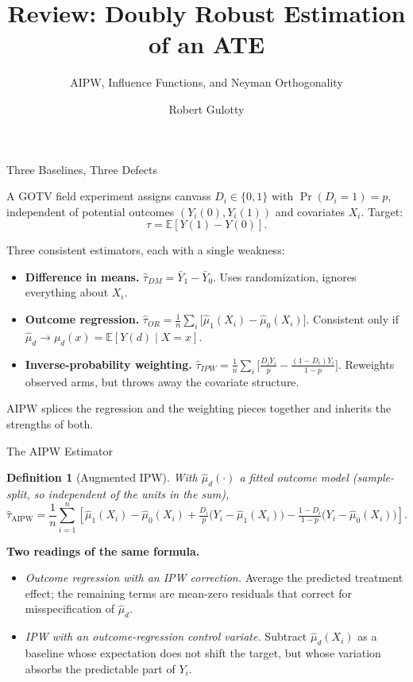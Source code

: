 \documentclass[aspectratio=169, handout, t]{beamer}
\title[PLSC 30700]{Review: Doubly Robust Estimation of an ATE}
\subtitle{AIPW, Influence Functions, and Neyman Orthogonality}
\author{Robert Gulotty}
\institute[Chicago]{University of Chicago}
\newtheorem{defn}{Definition}
\begin{document}
\begin{frame}
\titlepage
\end{frame}

\begin{frame}{Three Baselines, Three Defects}

A GOTV field experiment assigns canvass $D_i \in \{0,1\}$ with $\Pr(D_i = 1) = p$, independent of potential outcomes $(Y_i(0), Y_i(1))$ and covariates $X_i$.  Target:
$$\tau = \mathbb{E}[Y(1) - Y(0)].$$

\medskip
Three consistent estimators, each with a single weakness:
\begin{itemize}\itemsep=3pt
\item \textbf{Difference in means.}  $\hat\tau_{DM} = \bar Y_1 - \bar Y_0$.  Uses randomization, ignores everything about $X_i$.
\item \textbf{Outcome regression.}  $\hat\tau_{OR} = \tfrac{1}{n}\sum_i \big[\hat\mu_1(X_i) - \hat\mu_0(X_i)\big]$.  Consistent only if $\hat\mu_d \to \mu_d(x) = \mathbb{E}[Y(d)\mid X = x]$.
\item \textbf{Inverse-probability weighting.}  $\hat\tau_{IPW} = \tfrac{1}{n}\sum_i \big[\tfrac{D_iY_i}{p} - \tfrac{(1-D_i)Y_i}{1-p}\big]$.  Reweights observed arms, but throws away the covariate structure.
\end{itemize}

\medskip
AIPW splices the regression and the weighting pieces together and inherits the strengths of both.

\end{frame}

\begin{frame}{The AIPW Estimator}

\begin{defn}[Augmented IPW]
With $\hat\mu_d(\cdot)$ a fitted outcome model (sample-split, so independent of the units in the sum),
$$\hat\tau_{\mathrm{AIPW}} = \frac{1}{n}\sum_{i=1}^n \left[\hat\mu_1(X_i) - \hat\mu_0(X_i) + \tfrac{D_i}{p}\big(Y_i - \hat\mu_1(X_i)\big) - \tfrac{1-D_i}{1-p}\big(Y_i - \hat\mu_0(X_i)\big)\right].$$
\end{defn}

\medskip
\textbf{Two readings of the same formula.}
\begin{itemize}\itemsep=2pt
\item \textit{Outcome regression with an IPW correction.}  Average the predicted treatment effect; the remaining terms are mean-zero residuals that correct for misspecification of $\hat\mu_d$.
\item \textit{IPW with an outcome-regression control variate.}  Subtract $\hat\mu_d(X_i)$ as a baseline whose expectation does not shift the target, but whose variation absorbs the predictable part of $Y_i$.
\end{itemize}

\end{frame}
\end{document}
